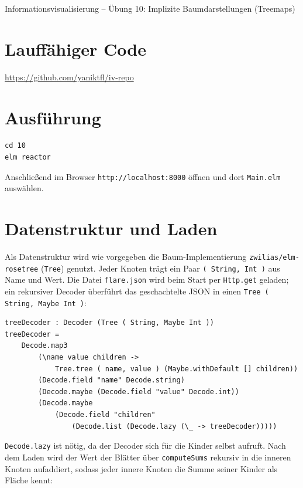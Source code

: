 \documentclass[11pt,a4paper]{article}
\begin{document}
\begin{center}
    {\Large Informationsvisualisierung -- Übung 10: Implizite Baumdarstellungen (Treemaps)}
\end{center}

\section*{Lauffähiger Code}

\href{https://github.com/yaniktfl/iv-repo}{https://github.com/yaniktfl/iv-repo}

\section*{Ausführung}

\begin{verbatim}
cd 10
elm reactor
\end{verbatim}

Anschließend im Browser \texttt{http://localhost:8000} öffnen und dort
\texttt{Main.elm} auswählen.

\section*{Datenstruktur und Laden}

Als Datenstruktur wird wie vorgegeben die Baum-Implementierung
\texttt{zwilias/elm-rosetree} (\texttt{Tree}) genutzt. Jeder Knoten trägt ein
Paar \texttt{( String, Int )} aus Name und Wert. Die Datei \texttt{flare.json}
wird beim Start per \texttt{Http.get} geladen; ein rekursiver Decoder überführt
das geschachtelte JSON in einen \texttt{Tree ( String, Maybe Int )}:

\begin{verbatim}
treeDecoder : Decoder (Tree ( String, Maybe Int ))
treeDecoder =
    Decode.map3
        (\name value children ->
            Tree.tree ( name, value ) (Maybe.withDefault [] children))
        (Decode.field "name" Decode.string)
        (Decode.maybe (Decode.field "value" Decode.int))
        (Decode.maybe
            (Decode.field "children"
                (Decode.list (Decode.lazy (\_ -> treeDecoder)))))
\end{verbatim}

\texttt{Decode.lazy} ist nötig, da der Decoder sich für die Kinder selbst
aufruft. Nach dem Laden wird der Wert der Blätter über \texttt{computeSums}
rekursiv in die inneren Knoten aufaddiert, sodass jeder innere Knoten die
Summe seiner Kinder als Fläche kennt:
\end{document}
